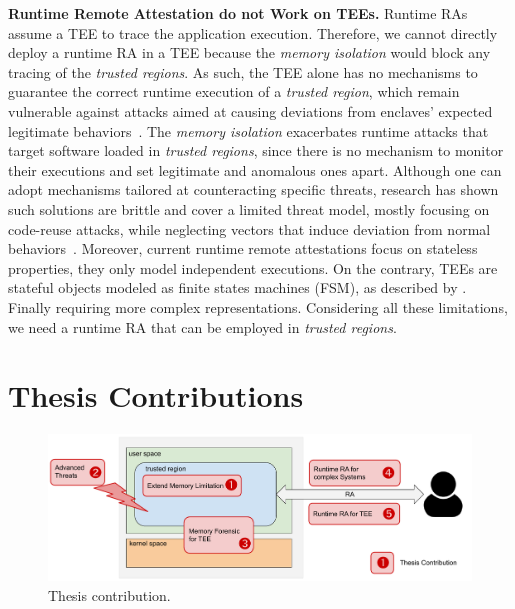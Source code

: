 \vspace{0.5cm}
\noindent \textbf{Runtime Remote Attestation do not Work on TEEs.}
Runtime RAs assume a TEE to trace the application execution.
Therefore, we cannot directly deploy a runtime RA in a TEE because the 
\emph{memory isolation} would block any tracing of the \emph{trusted regions}.
As such, the TEE alone has no mechanisms to guarantee the correct runtime 
execution of a \emph{trusted region}, which remain vulnerable against
attacks aimed at causing deviations from enclaves' expected legitimate
behaviors~\citep{tale-two-worlds,251582,biondo2018guard,lee2017hacking,snakegx}.
The \emph{memory isolation} exacerbates runtime attacks that target 
software loaded in \emph{trusted regions}, since there is no mechanism to 
monitor their executions and set legitimate and anomalous ones apart.
Although one can adopt mechanisms tailored at counteracting 
specific threats, research has shown such solutions are brittle and cover a 
limited threat model, mostly focusing on code-reuse attacks, while neglecting 
vectors that induce deviation from normal
behaviors~\citep{tale-two-worlds,251582,biondo2018guard,lee2017hacking}.
Moreover, current runtime remote attestations focus on
stateless properties, \ie they only model independent executions.  On
the contrary, TEEs are stateful objects modeled as finite states
machines (FSM), as described by \cite{costan2016intel}.
Finally requiring more complex representations.
Considering all these limitations, we need a runtime RA that can be employed in 
\emph{trusted regions}.

\section{Thesis Contributions}

\begin{figure}[t]
	\centering
	\includegraphics[width=\textwidth]{fig_c1/contribution.pdf}
	\caption[Thesis contribution.]{Thesis contribution.}
	\label{fig:contribution}
\end{figure}

